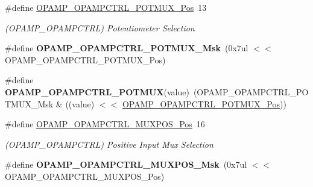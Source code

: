 \begin{DoxyCompactItemize}
\item 
\hypertarget{group___s_a_m_l21___o_p_a_m_p_ga8d093fd35c0148539cf70a4d7c9835d1}{}\#define \hyperlink{group___s_a_m_l21___o_p_a_m_p_ga8d093fd35c0148539cf70a4d7c9835d1}{O\+P\+A\+M\+P\+\_\+\+O\+P\+A\+M\+P\+C\+T\+R\+L\+\_\+\+P\+O\+T\+M\+U\+X\+\_\+\+Pos}~13\label{group___s_a_m_l21___o_p_a_m_p_ga8d093fd35c0148539cf70a4d7c9835d1}

\begin{DoxyCompactList}\small\item\em (O\+P\+A\+M\+P\+\_\+\+O\+P\+A\+M\+P\+C\+T\+R\+L) Potentiometer Selection \end{DoxyCompactList}\item 
\hypertarget{group___s_a_m_l21___o_p_a_m_p_ga530108d0e5479ac1509bfd24e6cc7914}{}\#define {\bfseries O\+P\+A\+M\+P\+\_\+\+O\+P\+A\+M\+P\+C\+T\+R\+L\+\_\+\+P\+O\+T\+M\+U\+X\+\_\+\+Msk}~(0x7ul $<$$<$ O\+P\+A\+M\+P\+\_\+\+O\+P\+A\+M\+P\+C\+T\+R\+L\+\_\+\+P\+O\+T\+M\+U\+X\+\_\+\+Pos)\label{group___s_a_m_l21___o_p_a_m_p_ga530108d0e5479ac1509bfd24e6cc7914}

\item 
\hypertarget{group___s_a_m_l21___o_p_a_m_p_gaf95a68b4d53c7e4723ff2c6aefa6d11e}{}\#define {\bfseries O\+P\+A\+M\+P\+\_\+\+O\+P\+A\+M\+P\+C\+T\+R\+L\+\_\+\+P\+O\+T\+M\+U\+X}(value)~(O\+P\+A\+M\+P\+\_\+\+O\+P\+A\+M\+P\+C\+T\+R\+L\+\_\+\+P\+O\+T\+M\+U\+X\+\_\+\+Msk \& ((value) $<$$<$ \hyperlink{group___s_a_m_l21___o_p_a_m_p_ga8d093fd35c0148539cf70a4d7c9835d1}{O\+P\+A\+M\+P\+\_\+\+O\+P\+A\+M\+P\+C\+T\+R\+L\+\_\+\+P\+O\+T\+M\+U\+X\+\_\+\+Pos}))\label{group___s_a_m_l21___o_p_a_m_p_gaf95a68b4d53c7e4723ff2c6aefa6d11e}

\item 
\hypertarget{group___s_a_m_l21___o_p_a_m_p_ga9505fc6cf5877486c9b730ecc53e0137}{}\#define \hyperlink{group___s_a_m_l21___o_p_a_m_p_ga9505fc6cf5877486c9b730ecc53e0137}{O\+P\+A\+M\+P\+\_\+\+O\+P\+A\+M\+P\+C\+T\+R\+L\+\_\+\+M\+U\+X\+P\+O\+S\+\_\+\+Pos}~16\label{group___s_a_m_l21___o_p_a_m_p_ga9505fc6cf5877486c9b730ecc53e0137}

\begin{DoxyCompactList}\small\item\em (O\+P\+A\+M\+P\+\_\+\+O\+P\+A\+M\+P\+C\+T\+R\+L) Positive Input Mux Selection \end{DoxyCompactList}\item 
\hypertarget{group___s_a_m_l21___o_p_a_m_p_gaf796f9ad202d01f7652609f680d86b89}{}\#define {\bfseries O\+P\+A\+M\+P\+\_\+\+O\+P\+A\+M\+P\+C\+T\+R\+L\+\_\+\+M\+U\+X\+P\+O\+S\+\_\+\+Msk}~(0x7ul $<$$<$ O\+P\+A\+M\+P\+\_\+\+O\+P\+A\+M\+P\+C\+T\+R\+L\+\_\+\+M\+U\+X\+P\+O\+S\+\_\+\+Pos)\label{group___s_a_m_l21___o_p_a_m_p_gaf796f9ad202d01f7652609f680d86b89}


\end{DoxyCompactItemize}
